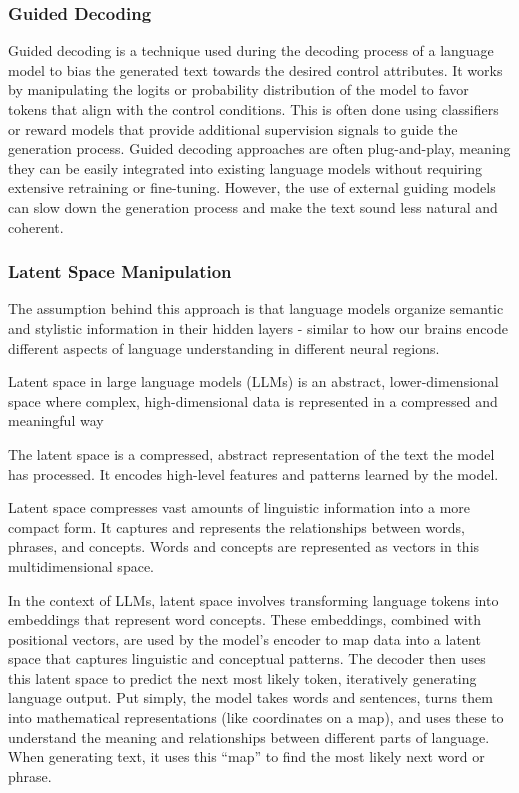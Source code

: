 \subsubsection{Guided Decoding}
Guided decoding is a technique used during the decoding process of a language model to bias the generated text towards the desired control attributes. 
It works by manipulating the logits or probability distribution of the model to favor tokens that align with the control conditions.
This is often done using classifiers or reward models that provide additional supervision signals to guide the generation process.
Guided decoding approaches are often plug-and-play, meaning they can be easily integrated into existing language models without requiring extensive retraining or fine-tuning.
However, the use of external guiding models can slow down the generation process and make the text sound less natural and coherent.

\subsubsection{Latent Space Manipulation}
The assumption behind this approach is that language models organize semantic and stylistic information in their hidden layers - similar to how our brains encode different aspects of language understanding in different neural regions.

Latent space in large language models (LLMs) is an abstract, lower-dimensional space where complex, high-dimensional data is represented in a compressed and meaningful way

The latent space is a compressed, abstract representation of the text the model has processed. It encodes high-level features and patterns learned by the model.

Latent space compresses vast amounts of linguistic information into a more compact form. 
It captures and represents the relationships between words, phrases, and concepts. 
Words and concepts are represented as vectors in this multidimensional space.

In the context of LLMs, latent space involves transforming language tokens into embeddings that represent word concepts. 
These embeddings, combined with positional vectors, are used by the model's encoder to map data into a latent space that captures linguistic and conceptual patterns. 
The decoder then uses this latent space to predict the next most likely token, iteratively generating language output.
Put simply, the model takes words and sentences, turns them into mathematical representations (like coordinates on a map), and uses these to understand the meaning and relationships between different parts of language. 
When generating text, it uses this “map” to find the most likely next word or phrase.

